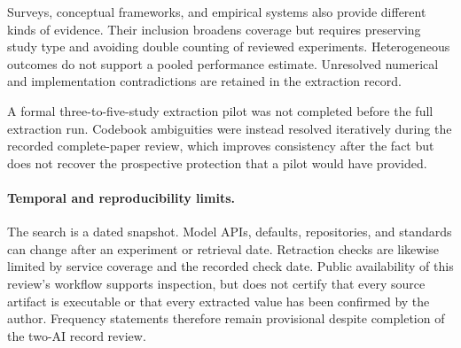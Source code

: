 Surveys, conceptual frameworks, and empirical systems also provide different kinds of evidence. Their inclusion broadens coverage but requires preserving study type and avoiding double counting of reviewed experiments. Heterogeneous outcomes do not support a pooled performance estimate. Unresolved numerical and implementation contradictions are retained in the extraction record.

A formal three-to-five-study extraction pilot was not completed before the full extraction run. Codebook ambiguities were instead resolved iteratively during the recorded complete-paper review, which improves consistency after the fact but does not recover the prospective protection that a pilot would have provided.

\paragraph{Temporal and reproducibility limits.}
The search is a dated snapshot. Model APIs, defaults, repositories, and standards can change after an experiment or retrieval date. Retraction checks are likewise limited by service coverage and the recorded check date. Public availability of this review's workflow supports inspection, but does not certify that every source artifact is executable or that every extracted value has been confirmed by the author. Frequency statements therefore remain provisional despite completion of the two-AI record review.
